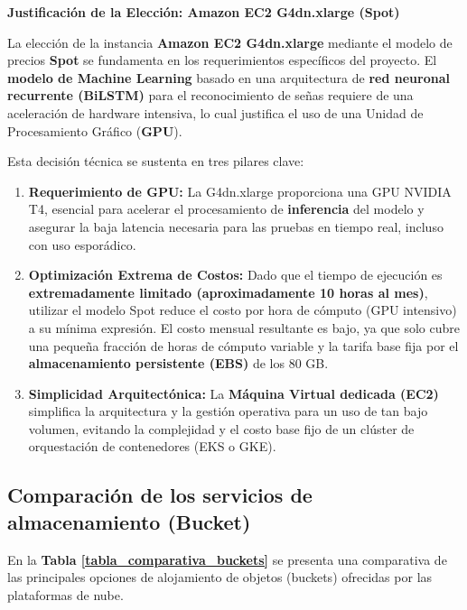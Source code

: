 \textbf{Justificación de la Elección: Amazon EC2 G4dn.xlarge (Spot)}

La elección de la instancia \textbf{Amazon EC2 G4dn.xlarge} mediante el modelo de precios \textbf{Spot} se fundamenta en los requerimientos específicos del proyecto. El \textbf{modelo de Machine Learning} basado en una arquitectura de \textbf{red neuronal recurrente (BiLSTM)} para el reconocimiento de señas requiere de una aceleración de hardware intensiva, lo cual justifica el uso de una Unidad de Procesamiento Gráfico (\textbf{GPU}).

Esta decisión técnica se sustenta en tres pilares clave:
\begin{enumerate}[label=\arabic*., nosep, itemsep=0pt]
    \item \textbf{Requerimiento de GPU:} La G4dn.xlarge proporciona una GPU NVIDIA T4, esencial para acelerar el procesamiento de \textbf{inferencia} del modelo y asegurar la baja latencia necesaria para las pruebas en tiempo real, incluso con uso esporádico.
    \item \textbf{Optimización Extrema de Costos:} Dado que el tiempo de ejecución es \textbf{extremadamente limitado (aproximadamente 10 horas al mes)}, utilizar el modelo Spot reduce el costo por hora de cómputo (GPU intensivo) a su mínima expresión. El costo mensual resultante es bajo, ya que solo cubre una pequeña fracción de horas de cómputo variable y la tarifa base fija por el \textbf{almacenamiento persistente (EBS)} de los 80 GB.
    \item \textbf{Simplicidad Arquitectónica:} La \textbf{Máquina Virtual dedicada (EC2)} simplifica la arquitectura y la gestión operativa para un uso de tan bajo volumen, evitando la complejidad y el costo base fijo de un clúster de orquestación de contenedores (EKS o GKE).
\end{enumerate}
\clearpage

\subsection{Comparación de los servicios de almacenamiento (Bucket)}
En la \textbf{Tabla \ref{tabla_comparativa_buckets}} se presenta una comparativa de las principales opciones de alojamiento de objetos (buckets) ofrecidas por las plataformas de nube.

\vspace{-0.2cm} %

